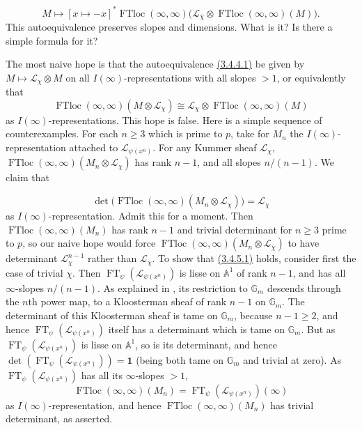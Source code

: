 \[
  M\longmapsto
  [x\mapsto -x]^*\operatorname{FTloc}(\infty,\infty)
  \bigl(\mathcal{L}_{\overline{\chi}}\otimes
  \operatorname{FTloc}(\infty,\infty)(M)\bigr).
\]
This autoequivalence preserves slopes and dimensions. What is it? Is there a
simple formula for it?

The most naive hope is that the autoequivalence
\hyperref[par:3.4.4.1]{(3.4.4.1)} be given by
\(M\mapsto\mathcal{L}_{\chi}\otimes M\) on all \(I(\infty)\)-representations
with all slopes \(>1\), or equivalently that
\[
  \operatorname{FTloc}(\infty,\infty)(M\otimes\mathcal{L}_{\chi})
  \cong
  \mathcal{L}_{\chi}\otimes\operatorname{FTloc}(\infty,\infty)(M)
\]
as \(I(\infty)\)-representations. This hope is false. Here is a simple
sequence of counterexamples. For each \(n\geq3\) which is prime to \(p\), take
for \(M_n\) the \(I(\infty)\)-representation attached to
\(\mathcal{L}_{\psi(x^n)}\). For any Kummer sheaf \(\mathcal{L}_{\chi}\),
\(\operatorname{FTloc}(\infty,\infty)(M_n\otimes\mathcal{L}_{\chi})\) has rank
\(n-1\), and all slopes \(n/(n-1)\). We claim that

\[
  \det\bigl(\operatorname{FTloc}(\infty,\infty)
  (M_n\otimes\mathcal{L}_{\chi})\bigr)
  =
  \mathcal{L}_{\chi}
\]
as \(I(\infty)\)-representation. Admit this for a moment. Then
\(\operatorname{FTloc}(\infty,\infty)(M_n)\) has rank \(n-1\) and trivial
determinant for \(n\geq3\) prime to \(p\), so our naive hope would force
\(\operatorname{FTloc}(\infty,\infty)(M_n\otimes\mathcal{L}_{\chi})\) to have
determinant \(\mathcal{L}_{\chi}^{n-1}\) rather than \(\mathcal{L}_{\chi}\).
To show that \hyperref[par:3.4.5.1]{(3.4.5.1)} holds, consider first the case
of trivial \(\chi\). Then \(\operatorname{FT}_{\psi}(\mathcal{L}_{\psi(x^n)})\)
is lisse on \(\mathbb{A}^1\) of rank \(n-1\), and has all \(\infty\)-slopes
\(n/(n-1)\). As explained in \cite[9.2]{Ka-GKM}, its restriction to
\(\mathbb{G}_m\) descends through the \(n\)th power map, to a Kloosterman sheaf
of rank \(n-1\) on \(\mathbb{G}_m\). The determinant of this Kloosterman sheaf
is tame on \(\mathbb{G}_m\), because \(n-1\geq2\), and hence
\(\operatorname{FT}_{\psi}(\mathcal{L}_{\psi(x^n)})\) itself has a determinant
which is tame on \(\mathbb{G}_m\). But as
\(\operatorname{FT}_{\psi}(\mathcal{L}_{\psi(x^n)})\) is lisse on
\(\mathbb{A}^1\), so is its determinant, and hence
\(\det(\operatorname{FT}_{\psi}(\mathcal{L}_{\psi(x^n)}))=\mathbf{1}\) (being
both tame on \(\mathbb{G}_m\) and trivial at zero). As
\(\operatorname{FT}_{\psi}(\mathcal{L}_{\psi(x^n)})\) has all its
\(\infty\)-slopes \(>1\),
\[
  \operatorname{FTloc}(\infty,\infty)(M_n)
  =
  \operatorname{FT}_{\psi}(\mathcal{L}_{\psi(x^n)})(\infty)
\]
as \(I(\infty)\)-representation, and hence
\(\operatorname{FTloc}(\infty,\infty)(M_n)\) has trivial determinant, as
asserted.

